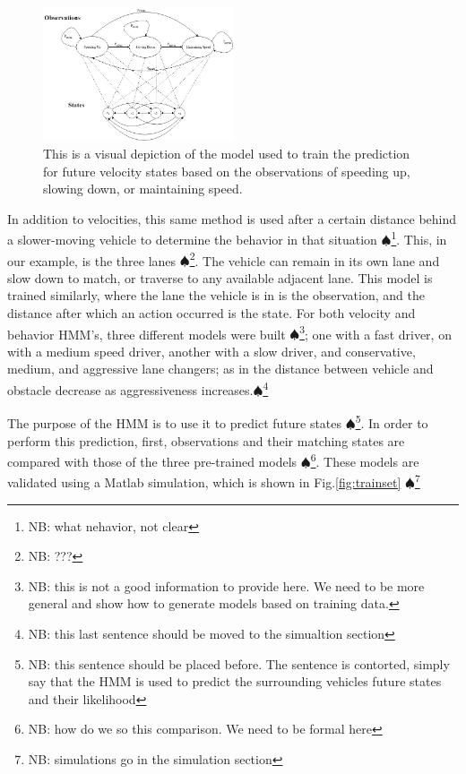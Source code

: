\documentclass[conference]{IEEEtran}
\newcommand\NB[1]{$\spadesuit$\footnote{NB: #1}}
\begin{document}
\begin{figure}[ht]
    \includegraphics[width=0.5\textwidth]{hmmdiag.jpg}
    \caption{This is a visual depiction of the model used to train the prediction for future velocity states based on the observations of speeding up, slowing down, or maintaining speed.}
    \label{fig:hmmdiag}
\end{figure}

In addition to velocities, this same method is used after a certain distance behind a slower-moving vehicle to determine the behavior in that situation \NB{what nehavior, not clear}. This, in our example, is the three lanes \NB{???}. The vehicle can remain in its own lane and slow down to match, or traverse to any available adjacent lane. This model is trained similarly, where the lane the vehicle is in is the observation, and the distance after which an action occurred is the state. For both velocity and behavior HMM's, three different models were built \NB{this is not a good information to provide here. We need to be more general and show how to generate models based on training data.}; one with a fast driver, on with a medium speed driver, another with a slow driver, and conservative, medium, and aggressive lane changers; as in the distance between vehicle and obstacle decrease as aggressiveness increases.\NB{this last sentence should be moved to the simualtion section}

The purpose of the HMM is to use it to predict future states \NB{this sentence should be placed before. The sentence is contorted, simply say that the HMM is used to predict the surrounding vehicles future states and their likelihood}. In order to perform this prediction, first, observations and their matching states are compared with those of the three pre-trained models \NB{how do we so this comparison. We need to be formal here}. These models are validated using a Matlab simulation, which is shown in Fig.\ref{fig:trainset} \NB{simulations go in the simulation section}
\end{document}
